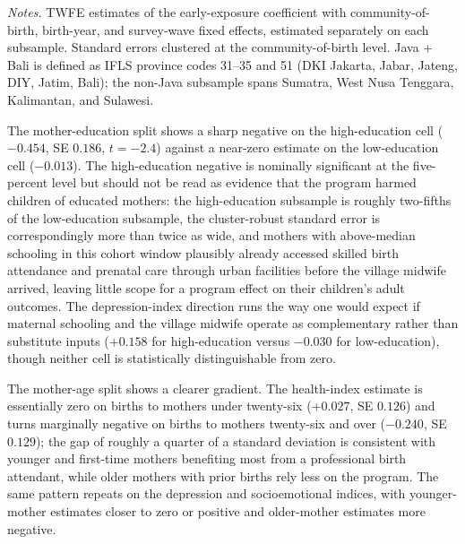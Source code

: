 \begin{table}[!htbp] \centering \caption{Heterogeneity by mother's education, mother's age at birth, and region.} \label{tab:heterogeneity} \resizebox{\textwidth}{!}{} \begin{minipage}{0.97\textwidth} \footnotesize \emph{Notes.} TWFE estimates of the early-exposure coefficient with community-of-birth, birth-year, and survey-wave fixed effects, estimated separately on each subsample. Standard errors clustered at the community-of-birth level. Java + Bali is defined as IFLS province codes 31--35 and 51 (DKI Jakarta, Jabar, Jateng, DIY, Jatim, Bali); the non-Java subsample spans Sumatra, West Nusa Tenggara, Kalimantan, and Sulawesi. \end{minipage} \end{table}

The mother-education split shows a sharp negative on the high-education cell ($-0.454$, SE $0.186$, $t=-2.4$) against a near-zero estimate on the low-education cell ($-0.013$). The high-education negative is nominally significant at the five-percent level but should not be read as evidence that the program harmed children of educated mothers: the high-education subsample is roughly two-fifths of the low-education subsample, the cluster-robust standard error is correspondingly more than twice as wide, and mothers with above-median schooling in this cohort window plausibly already accessed skilled birth attendance and prenatal care through urban facilities before the village midwife arrived, leaving little scope for a program effect on their children's adult outcomes. The depression-index direction runs the way one would expect if maternal schooling and the village midwife operate as complementary rather than substitute inputs ($+0.158$ for high-education versus $-0.030$ for low-education), though neither cell is statistically distinguishable from zero.

The mother-age split shows a clearer gradient. The health-index estimate is essentially zero on births to mothers under twenty-six ($+0.027$, SE $0.126$) and turns marginally negative on births to mothers twenty-six and over ($-0.240$, SE $0.129$); the gap of roughly a quarter of a standard deviation is consistent with younger and first-time mothers benefiting most from a professional birth attendant, while older mothers with prior births rely less on the program. The same pattern repeats on the depression and socioemotional indices, with younger-mother estimates closer to zero or positive and older-mother estimates more negative.

